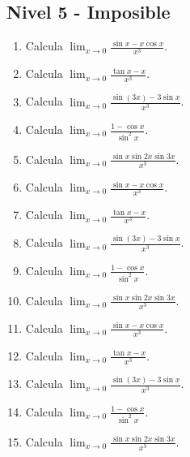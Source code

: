 \documentclass[11pt,a4paper]{article}
\begin{document}
\newpage

\subsection{Nivel 5 - Imposible}

\begin{enumerate}[label=\textbf{E\arabic*.},start=481]

\item Calcula $\displaystyle \lim_{x\to0}\frac{\sin x-x\cos x}{x^3}$.

\item Calcula $\displaystyle \lim_{x\to0}\frac{\tan x-x}{x^3}$.

\item Calcula $\displaystyle \lim_{x\to0}\frac{\sin(3x)-3\sin x}{x^3}$.

\item Calcula $\displaystyle \lim_{x\to0}\frac{1-\cos x}{\sin^2x}$.

\item Calcula $\displaystyle \lim_{x\to0}\frac{\sin x\sin2x\sin3x}{x^3}$.

\item Calcula $\displaystyle \lim_{x\to0}\frac{\sin x-x\cos x}{x^3}$.

\item Calcula $\displaystyle \lim_{x\to0}\frac{\tan x-x}{x^3}$.

\item Calcula $\displaystyle \lim_{x\to0}\frac{\sin(3x)-3\sin x}{x^3}$.

\item Calcula $\displaystyle \lim_{x\to0}\frac{1-\cos x}{\sin^2x}$.

\item Calcula $\displaystyle \lim_{x\to0}\frac{\sin x\sin2x\sin3x}{x^3}$.

\item Calcula $\displaystyle \lim_{x\to0}\frac{\sin x-x\cos x}{x^3}$.

\item Calcula $\displaystyle \lim_{x\to0}\frac{\tan x-x}{x^3}$.

\item Calcula $\displaystyle \lim_{x\to0}\frac{\sin(3x)-3\sin x}{x^3}$.

\item Calcula $\displaystyle \lim_{x\to0}\frac{1-\cos x}{\sin^2x}$.

\item Calcula $\displaystyle \lim_{x\to0}\frac{\sin x\sin2x\sin3x}{x^3}$.


\end{enumerate}
\end{document}
